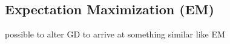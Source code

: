 \subsection{Expectation Maximization (EM)}

possible to alter GD to arrive at something similar like EM